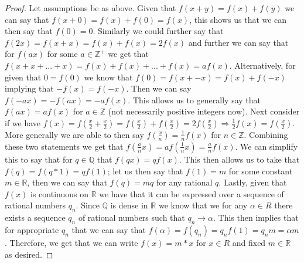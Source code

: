 \documentclass[11pt]{article}
\theoremstyle{definition}
\newcommand{\R}{\mathbb{R}}
\newcommand{\Z}{\mathbb{Z}}
\newcommand{\Q}{\mathbb{Q}}
\begin{document}
\begin{proof}
Let assumptions be as above. Given that $f(x+y) = f(x) + f(y)$ we can say that $f(x+0) = f(x) + f(0) = f(x)$, this shows us that we can then say that $f(0) = 0.$ Similarly we could further say that $f(2x) = f(x+x) = f(x) + f(x) = 2f(x)$ and further we can say that for $f(ax)$ for some $a\in \Z^+$ we get that $f(x + x + ... + x) = f(x) + f(x) + ... + f(x) = af(x)$. Alternatively, for given that $0 = f(0)$ we know that $f(0) = f(x + -x) = f(x) + f(-x)$ implying that $-f(x) = f(-x)$. Then we can say $f(-ax) = -f(ax) = -af(x)$. This allows us to generally say that $f(ax) = af(x)$ for $a\in \Z$ (not necessarily positive integers now). Next consider if we have $f(x) = f(\frac{x}{2} + \frac{x}{2}) = f(\frac{x}{2}) + f(\frac{x}{2}) = 2f(\frac{x}{2}) \Rightarrow \frac{1}{2}f(x) = f(\frac{x}{2})$. More generally we are able to then say $f(\frac{x}{n}) = \frac{1}{n}f(x)$ for $n\in \Z$. Combining these two statements we get that $f(\frac{a}{n}x) = af(\frac{1}{n}x) = \frac{a}{n}f(x)$. We can simplify this to say that for $q\in \Q$ that $f(qx) = qf(x).$ This then allows us to take that $f(q) = f(q*1) = qf(1)$; let us then say that $f(1) = m$ for some constant $m\in \R$, then we can say that $f(q) = mq$ for any rational $q$. Lastly, given that $f(x)$ is continuous on $\R$ we have that it can be expressed over a sequence of rational numbers $q_n$. Since $\Q$ is dense in $\R$ we know that we for any $\alpha \in R$ there exists a sequence $q_n$ of rational numbers such that $q_n \rightarrow \alpha.$ This then implies that for appropriate $q_n$ that we can say that $f(\alpha) = f(q_n) = q_nf(1) = q_nm = \alpha m$. Therefore, we get that we can write $f(x) = m*x$ for $x\in R$ and fixed $m \in \R$ as desired.
\end{proof}
\end{document}
